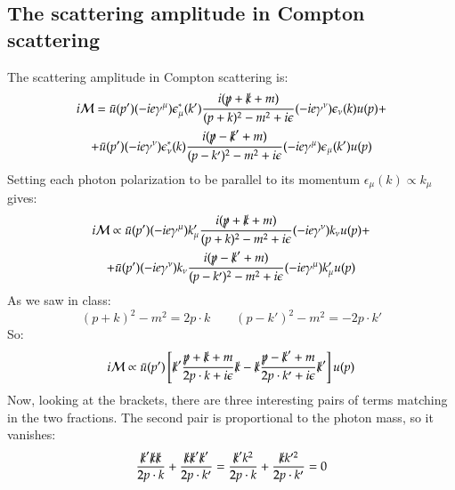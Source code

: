 \documentclass{article}
\begin{document}
\subsection{The scattering amplitude in Compton scattering}
The scattering amplitude in Compton scattering is:
\begin{equation}
\begin{gathered}
    i\mathcal{M} =
    \bar{u}(p')(-ie\gamma^\mu)\epsilon_\mu^*(k') \frac{i(\slashed{p} + \slashed{k} + m)}{(p + k)^2 - m^2 + i\epsilon}(-ie\gamma^\nu)\epsilon_\nu(k)u(p) + \\ +
    \bar{u}(p')(-ie\gamma^\nu)\epsilon_\nu^*(k) \frac{i(\slashed{p} - \slashed{k}' + m)}{(p - k')^2 - m^2 + i\epsilon}(-ie\gamma^\mu)\epsilon_\mu(k')u(p)
\end{gathered}
\end{equation}
Setting each photon polarization to be parallel to its momentum $\epsilon_\mu(k) \propto k_\mu$ gives:
\begin{equation}
\begin{gathered}
    i\mathcal{M} \propto
    \bar{u}(p')(-ie\gamma^\mu)k'_\mu \frac{i(\slashed{p} + \slashed{k} + m)}{(p + k)^2 - m^2 + i\epsilon}(-ie\gamma^\nu)k_\nu u(p) + \\ +
    \bar{u}(p')(-ie\gamma^\nu)k_\nu \frac{i(\slashed{p} - \slashed{k}' + m)}{(p - k')^2 - m^2 + i\epsilon}(-ie\gamma^\mu)k'_\mu u(p)
\end{gathered}
\end{equation}
As we saw in class:
\begin{equation}
    (p + k)^2 - m^2 = 2p\cdot k \qquad (p - k')^2 - m^2 = -2p\cdot k'
\end{equation}
So:
\begin{equation}
\begin{gathered}
    i\mathcal{M} \propto
    \bar{u}(p') \left[
        \slashed{k}' \frac{\slashed{p} + \slashed{k} + m}{2p\cdot k + i\epsilon}\slashed{k} -
        \slashed{k} \frac{\slashed{p} - \slashed{k}' + m}{2p\cdot k' + i\epsilon}\slashed{k}'
    \right] u(p)
\end{gathered}
\end{equation}
Now, looking at the brackets, there are three interesting pairs of terms matching in the two fractions. The second pair is proportional to the photon mass, so it vanishes:
\begin{equation}
    \frac{\slashed{k}'\slashed{k}\slashed{k}}{2p\cdot k} + \frac{\slashed{k}\slashed{k}'\slashed{k}'}{2p\cdot k'} = \frac{\slashed{k}'k^2}{2p\cdot k} + \frac{\slashed{k}k'^2}{2p\cdot k'} = 0
\end{equation}
\end{document}
